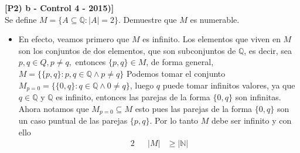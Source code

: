 \documentclass[letterpaper,12pt]{article}
\newcommand{\Q}{\mathbb Q}
\newcommand{\N}{\mathbb N}
\theoremstyle{plain}
\begin{document}
\begin{enumerate}[a)]
    \textbf{[P2) b - Control 4 - 2015)]}\\ Se define $M=\{A\subseteq \Q: |A|=2 \}$. Demuestre que $M$ es numerable.
        \begin{itemize}
            \item En efecto, veamos primero que $M$ es infinito. Los elementos que viven en $M$ son los conjuntos de dos elementos, que son subconjuntos de $\Q$, es decir, sea $p,q \in Q, p\neq q,$ entonces  $\{p,q\}\in M$, de forma general, $M=\{\{p,q\} : p,q \in \Q \land p\neq q \}$
            Podemos tomar el conjunto $M_{p=0}=\{\{0,q\} : q \in \Q \land 0\neq q \} $, luego $q$ puede tomar infinitos valores, ya que $q\in \Q$ y $\Q$ es infinito, entonces las parejas de la forma $\{0,q\}$ son infinitas.\\
            Ahora notamos que $M_{p=0} \subseteq M$ esto pues las parejas de la forma $\{0,q\}$ son un caso puntual de las parejas $\{p,q\}$. Por lo tanto $M$ debe ser infinito y con ello
             \begin{alignat}{2}
                && |M|&\geq|\N|
             \end{alignat}
            

\end{itemize}
\end{enumerate}
\end{document}
